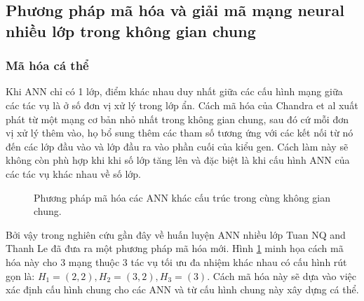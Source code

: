 \subsection{Phương pháp mã hóa và giải mã mạng neural nhiều lớp trong không gian chung}
\subsubsection{Mã hóa cá thể}
Khi ANN chỉ có 1 lớp, điểm khác nhau duy nhất giữa các cấu hình mạng giữa các tác vụ là ở số đơn vị xử lý trong lớp ẩn. Cách mã hóa của Chandra et al\cite{chandra2018evolutionary} xuất phát từ một mạng cơ bản nhỏ nhất trong không gian chung, sau đó cứ mỗi đơn vị xử lý thêm vào, họ bổ sung thêm các tham số tương ứng với các kết nối từ nó đến các lớp đầu vào và lớp đầu ra vào phần cuối của kiểu gen. Cách làm này sẽ không còn phù hợp khi khi số lớp tăng lên và đặc biệt là khi cấu hình ANN của các tác vụ khác nhau về số lớp. 
\begin{figure}[h!]
    \centering
    \caption{Phương pháp mã hóa các ANN khác cấu trúc trong cùng không gian chung.}
    \label{fig:encode}
\end{figure}
Bởi vậy trong nghiên cứu gần đây về huấn luyện ANN nhiều lớp Tuan NQ and Thanh Le\cite{nqtuan} đã đưa ra một phương pháp mã hóa mới. Hình \ref{fig:encode} minh họa cách mã hóa này cho 3 mạng thuộc 3 tác vụ tối ưu đa nhiệm khác nhau có cấu hình rút gọn là: $H_1 = (2,2), H_2=(3,2), H_3=(3)$. Cách mã hóa này sẽ dựa vào việc xác định cấu hình chung cho các ANN và từ cấu hình chung này xây dựng cá thể.

